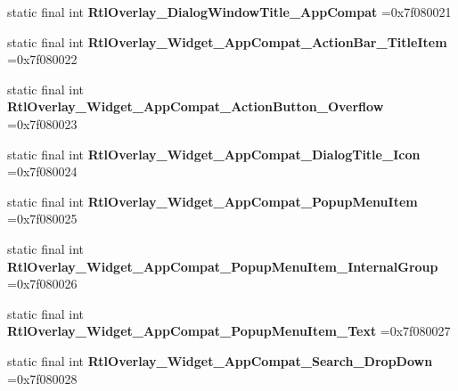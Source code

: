 \begin{DoxyCompactItemize}
\item 
\hypertarget{classcheck_1_1test_1_1_r_1_1style_ae6d8c1665b0737a1ab0df6978d18ae21}{}static final int {\bfseries Rtl\+Overlay\+\_\+\+Dialog\+Window\+Title\+\_\+\+App\+Compat} =0x7f080021\label{classcheck_1_1test_1_1_r_1_1style_ae6d8c1665b0737a1ab0df6978d18ae21}

\item 
\hypertarget{classcheck_1_1test_1_1_r_1_1style_ae34e14f73aca3bdeb26e6acd70c7a46a}{}static final int {\bfseries Rtl\+Overlay\+\_\+\+Widget\+\_\+\+App\+Compat\+\_\+\+Action\+Bar\+\_\+\+Title\+Item} =0x7f080022\label{classcheck_1_1test_1_1_r_1_1style_ae34e14f73aca3bdeb26e6acd70c7a46a}

\item 
\hypertarget{classcheck_1_1test_1_1_r_1_1style_a6e6f75093d7bbd10f86c45e78c0ce331}{}static final int {\bfseries Rtl\+Overlay\+\_\+\+Widget\+\_\+\+App\+Compat\+\_\+\+Action\+Button\+\_\+\+Overflow} =0x7f080023\label{classcheck_1_1test_1_1_r_1_1style_a6e6f75093d7bbd10f86c45e78c0ce331}

\item 
\hypertarget{classcheck_1_1test_1_1_r_1_1style_af5db967c3155ca3de292e228aba6349d}{}static final int {\bfseries Rtl\+Overlay\+\_\+\+Widget\+\_\+\+App\+Compat\+\_\+\+Dialog\+Title\+\_\+\+Icon} =0x7f080024\label{classcheck_1_1test_1_1_r_1_1style_af5db967c3155ca3de292e228aba6349d}

\item 
\hypertarget{classcheck_1_1test_1_1_r_1_1style_aed4ce88062a8d90ff1af5c1efa5e93a6}{}static final int {\bfseries Rtl\+Overlay\+\_\+\+Widget\+\_\+\+App\+Compat\+\_\+\+Popup\+Menu\+Item} =0x7f080025\label{classcheck_1_1test_1_1_r_1_1style_aed4ce88062a8d90ff1af5c1efa5e93a6}

\item 
\hypertarget{classcheck_1_1test_1_1_r_1_1style_ae2d45c8ef97fca171eba9a32a4f679f4}{}static final int {\bfseries Rtl\+Overlay\+\_\+\+Widget\+\_\+\+App\+Compat\+\_\+\+Popup\+Menu\+Item\+\_\+\+Internal\+Group} =0x7f080026\label{classcheck_1_1test_1_1_r_1_1style_ae2d45c8ef97fca171eba9a32a4f679f4}

\item 
\hypertarget{classcheck_1_1test_1_1_r_1_1style_af001a4631d7aee3bbdb4b0f34a9839b8}{}static final int {\bfseries Rtl\+Overlay\+\_\+\+Widget\+\_\+\+App\+Compat\+\_\+\+Popup\+Menu\+Item\+\_\+\+Text} =0x7f080027\label{classcheck_1_1test_1_1_r_1_1style_af001a4631d7aee3bbdb4b0f34a9839b8}

\item 
\hypertarget{classcheck_1_1test_1_1_r_1_1style_a03b083ed92533cb843980ba76b68dec6}{}static final int {\bfseries Rtl\+Overlay\+\_\+\+Widget\+\_\+\+App\+Compat\+\_\+\+Search\+\_\+\+Drop\+Down} =0x7f080028\label{classcheck_1_1test_1_1_r_1_1style_a03b083ed92533cb843980ba76b68dec6}


\end{DoxyCompactItemize}
